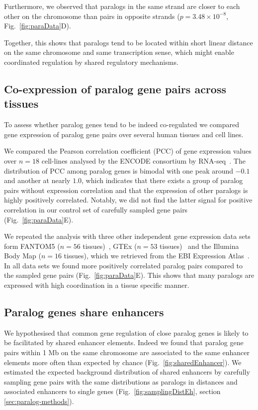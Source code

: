 \documentclass[a4paper,twoside=true,openright,parskip=full,chapterprefix=true,11pt,headings=normal,bibliography=totoc,listof=totoc,titlepage=on,captions=tableabove,draft=false]{scrreprt}
\theoremstyle{definition}
\theoremstyle{definition}
\theoremstyle{definition}
\theoremstyle{remark}
\begin{document}
Furthermore, we observed that paralogs in the same strand are closer to
each other on the chromosome than pairs in opposite strands
(\(p=3.48\times10^{-8}\), Fig.~\ref{fig:paraData}D).

Together, this shows that paralogs tend to be located within short
linear distance on the same chromosome and same transcription sense,
which might enable coordinated regulation by shared regulatory
mechanisms.

\subsection{Co-expression of paralog gene pairs across
tissues}\label{co-expression-of-paralog-gene-pairs-across-tissues}

To assess whether paralog genes tend to be indeed co-regulated we
compared gene expression of paralog gene pairs over several human
tissues and cell lines.

We compared the Pearson correlation coefficient (PCC) of gene expression
values over \(n = 18\) cell-lines analysed by the ENCODE consortium by
RNA-seq~\citep{Djebali2012}. The distribution of PCC among paralog genes
is bimodal with one peak around \(-0.1\) and another at nearly \(1.0\),
which indicates that there exists a group of paralog pairs without
expression correlation and that the expression of other paralogs is
highly positively correlated. Notably, we did not find the latter signal
for positive correlation in our control set of carefully sampled gene
pairs (Fig.~\ref{fig:paraData}E).

We repeated the analysis with three other independent gene expression
data sets form FANTOM5 (\(n=56\) tissues)~\citep{Forrest2014}, GTEx
(\(n=53\) tissues)~\citep{GTExConsortium2015} and the Illumina Body Map
(\(n=16\) tissues), which we retrieved from the EBI Expression
Atlas~\citep{Petryszak2015}. In all data sets we found more positively
correlated paralog pairs compared to the sampled gene pairs
(Fig.~\ref{fig:paraData}E). This shows that many paralogs are expressed
with high coordination in a tissue specific manner.

\subsection{Paralog genes share
enhancers}\label{paralog-genes-share-enhancers}

We hypothesised that common gene regulation of close paralog genes is
likely to be facilitated by shared enhancer elements. Indeed we found
that paralog gene pairs within 1 Mb on the same chromosome are
associated to the same enhancer elements more often than expected by
chance (Fig.~\ref{fig:sharedEnhancer}). We estimated the expected
background distribution of shared enhancers by carefully sampling gene
pairs with the same distributions as paralogs in distances and
associated enhancers to single genes (Fig.~\ref{fig:samplingDistEh},
section \ref{sec:paralog-methods}).
\end{document}
